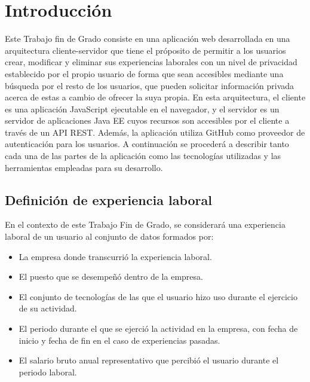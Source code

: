 \documentclass[a4paper, 12pt]{book}
\begin{document}

\cleardoublepage
\chapter{Introducción}
\label{sec:intro} %

Este Trabajo fin de Grado consiste en una aplicación web desarrollada en una arquitectura cliente-servidor que tiene el próposito de permitir a los usuarios crear, modificar y eliminar sus experiencias laborales con un nivel de privacidad establecido por el propio usuario
de forma que sean accesibles mediante una búsqueda por el resto de los usuarios, que pueden solicitar información privada acerca de estas a cambio de ofrecer la suya propia. 
En esta arquitectura, el cliente es una aplicación JavaScript ejecutable en el navegador, 
y el servidor es un servidor de aplicaciones Java EE cuyos recursos son accesibles por el cliente a través de un API REST. Además, la aplicación utiliza GitHub como proveedor de autenticación para los usuarios. 
A continuación se procederá a describir tanto cada una de las partes de la aplicación como las tecnologías utilizadas y las herramientas empleadas para su desarrollo.

\section{Definición de experiencia laboral}
\label{sec:intro_workexperiencedefinition}
En el contexto de este Trabajo Fin de Grado, se considerará una experiencia laboral de un usuario al conjunto de datos formados por:

\begin{itemize}
  \item La empresa donde transcurrió la experiencia laboral.
  \item El puesto que se desempeñó dentro de la empresa.
  \item El conjunto de tecnologías de las que el usuario hizo uso durante el ejercicio de su actividad.
  \item El periodo durante el que se ejerció la actividad en la empresa, con fecha de inicio y fecha de fin en el caso de experiencias pasadas.
  \item El salario bruto anual representativo que percibió el usuario durante el periodo laboral.
\end{itemize}
\end{document}

